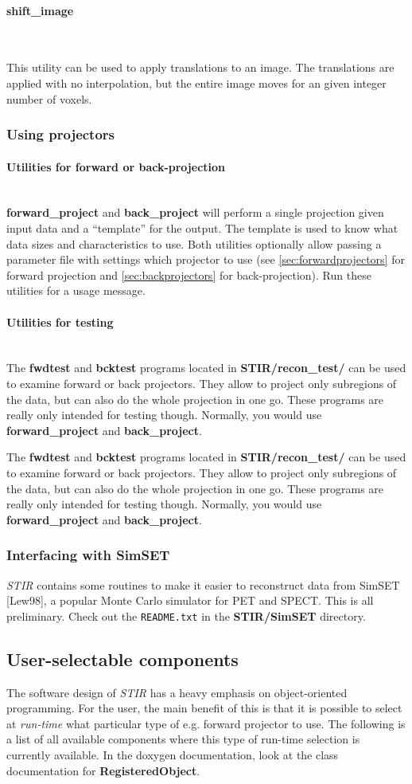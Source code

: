 \documentclass{article}
\newcommand{\subsubsubsection}[1]{\paragraph{#1}\mbox{} \\}
\begin{document}
{{{ \subsubsubsection{shift\_image}
}
This utility can be used to
apply translations to an image. The translations are applied with no
interpolation, but the entire image moves for an given integer number of
voxels. 

\subsubsection{
Using projectors}

\subsubsubsection{
Utilities for forward or back-projection}
\textbf{forward\_project} and \textbf{back\_project} will perform a single projection given
input data and a ``template'' for the output. The template is used to know what data sizes and
characteristics to use. Both utilities optionally allow passing a parameter file with settings
which projector to use (see \ref{sec:forwardprojectors} for forward projection
and \ref{sec:backprojectors} for back-projection).
Run these utilities for a usage message.

\subsubsubsection{Utilities for testing}
The \textbf{fwdtest} and \textbf{bcktest} programs located in \textbf{STIR/recon\_test/} can 
be used to examine forward or back projectors. They allow to 
project only subregions of the data, but can also do the whole 
projection in one go. These programs are really only intended for testing though.
Normally, you would use \textbf{forward\_project} and \textbf{back\_project}.

The \textbf{fwdtest} and \textbf{bcktest} programs located in \textbf{STIR/recon\_test/} can 
be used to examine forward or back projectors. They allow to 
project only subregions of the data, but can also do the whole 
projection in one go. These programs are really only intended for testing though.
Normally, you would use \textbf{forward\_project} and \textbf{back\_project}.


\subsubsection{
Interfacing with SimSET}
\textit{STIR} contains some routines to make it easier to reconstruct data from SimSET [Lew98], 
a popular Monte Carlo simulator for PET and SPECT. This
is all preliminary. Check out the \texttt{README.txt} in the \textbf{STIR/SimSET} directory.


\subsection{
User-selectable components}
\label{sec:user-selectablecomponents}
The software design of \textit{STIR} has a heavy emphasis on object-oriented 
programming. For the user, the main benefit of this is that it 
is possible to select at \textit{run-time} what particular type of 
e.g. forward projector to use. The following is a list of all 
available components where this type of run-time selection is 
currently available. In the doxygen documentation, look at the 
class documentation for \textbf{RegisteredObject}.


}}
\end{document}
